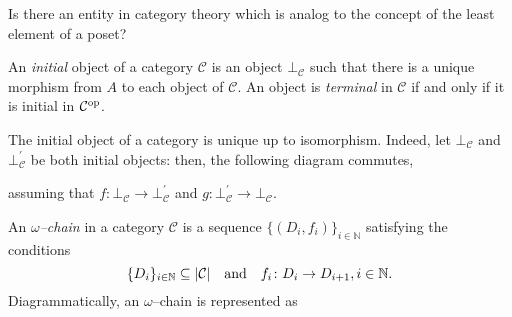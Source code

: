 Is there an entity in category theory which is analog to the concept of the least element of a poset?

\begin{dfn}
  An \emph{initial} object of a category \(\mathcal{C}\) is an object \(\bot_{\mathcal{C}}\) such that there is a unique morphism from \(A\) to each object of \(\mathcal{C}\).
  An object is \emph{terminal} in \(\mathcal{C}\) if and only if it is initial in \(\mathcal{C}^\textup{op}\).
\end{dfn}

The initial object of a category is unique up to isomorphism. Indeed, let \(\bot_{\mathcal{C}}\) and \(\bot_{\mathcal{C}}^\prime\) be both initial objects: then, the following diagram commutes,
\begin{center}
\end{center}
assuming that \(f \colon \bot_{\mathcal{C}} \to \bot_{\mathcal{C}}^\prime\) and \(g \colon \bot_{\mathcal{C}}^\prime \to \bot_{\mathcal{C}}\).

\begin{dfn}\label{dfn:omega-chain}
  An \emph{\(\omega\)--chain} in a category \(\mathcal{C}\) is a sequence
  \(\lbrace (D_i,f_i) \rbrace_{i \in \mathbb{N}}\) satisfying the conditions
  \begin{equation*}
    \lbrace D_i \rbrace_{i \in \mathbb{N}} \subseteq \lvert \mathcal{C} \rvert \quad
    \text{and} \quad f_i \colon D_i \to D_{i+1}, i \in \mathbb{N}.
  \end{equation*}
  Diagrammatically, an \(\omega\)--chain is represented as
  \begin{center}
  \end{center}
\end{dfn}


